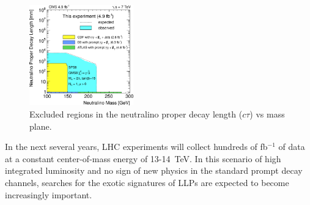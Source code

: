 \documentclass[twocolumn,twoside,10pt,nodate]{article}
\begin{document}
\begin{figure}[h]
\centering
\includegraphics[width=0.40\textwidth,angle=0]{santanastasio_fig2.png}
\caption{\small Excluded regions in the neutralino proper decay length
  ($c\tau$) vs mass plane.} %
\end{figure}

In the next several years, LHC experiments will collect hundreds of fb$^{-1}$
of data at a constant center-of-mass energy of 13-14~TeV. In this scenario of high
integrated luminosity and no sign of new physics in the standard 
prompt decay channels, searches for the exotic signatures of LLPs are
expected to become increasingly important.


\end{document}
